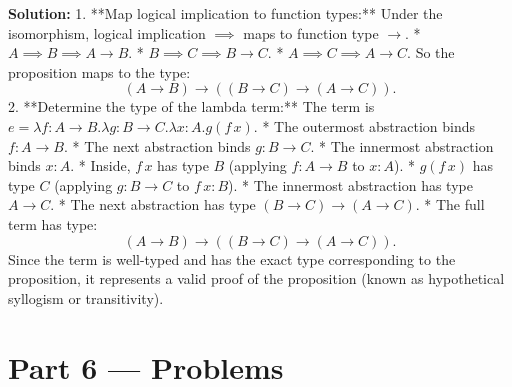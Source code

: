 \documentclass[12pt, a4paper]{book}
\begin{document}
\begin{problembox}
\begin{enumerate}[label=\textbf{E\arabic*.}]
        \textbf{Solution:}
        1. **Map logical implication to function types:**
           Under the isomorphism, logical implication $\implies$ maps to function type $\to$.
           * $A \implies B \implies A \to B$.
           * $B \implies C \implies B \to C$.
           * $A \implies C \implies A \to C$.
           So the proposition maps to the type:
           \[
             (A \to B) \to ((B \to C) \to (A \to C)).
           \]
        2. **Determine the type of the lambda term:**
           The term is $e = \lambda f : A \to B. \lambda g : B \to C. \lambda x : A. g (f \, x)$.
           * The outermost abstraction binds $f : A \to B$.
           * The next abstraction binds $g : B \to C$.
           * The innermost abstraction binds $x : A$.
           * Inside, $f \, x$ has type $B$ (applying $f : A \to B$ to $x : A$).
           * $g (f \, x)$ has type $C$ (applying $g : B \to C$ to $f \, x : B$).
           * The innermost abstraction has type $A \to C$.
           * The next abstraction has type $(B \to C) \to (A \to C)$.
           * The full term has type:
             \[
               (A \to B) \to ((B \to C) \to (A \to C)).
             \]
        Since the term is well-typed and has the exact type corresponding to the proposition, it represents a valid proof of the proposition (known as hypothetical syllogism or transitivity).
\end{enumerate}
\end{problembox}

\newpage

\section{Part 6 --- Problems}
\end{document}
